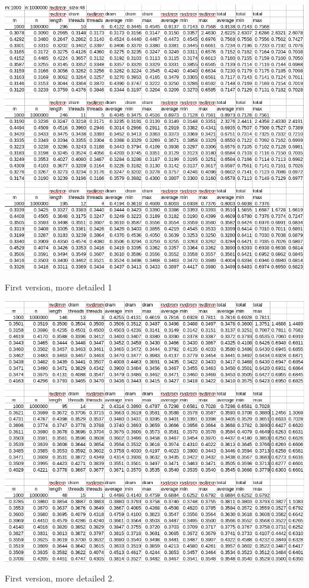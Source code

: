 \documentclass[12pt,a4paper,USenglish]{article}      %
\begin{document}
\begin{table}[!hbtp]
\includegraphics[scale=0.6]{first_version_more_detailed_1.png}
\caption{First version, more detailed 1}
\end{table}

\begin{table}[!hbtp]
\includegraphics[scale=0.6]{first_version_more_detailed_2.png}
\caption{First version, more detailed 2.}
\end{table}
\end{document}
